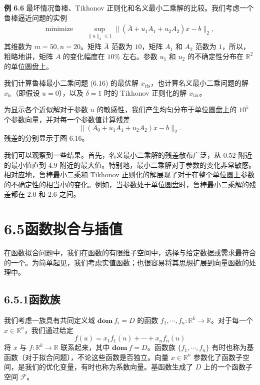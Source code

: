 \documentclass[UTF8, 12pt, fontset=fandol, oneside]{ctexart}
\begin{document}
\noindent\textbf{例 6.6}\quad
最坏情况鲁棒、Tikhonov 正则化和名义最小二乘解的比较。我们考虑一个鲁棒逼近问题的实例
\begin{equation}
\begin{aligned}
\text{minimize}\quad & \sup_{\|u\|_2\leq 1}\|(\bar{A}+u_1A_1+u_2A_2)x-b\|_2,
\end{aligned}
\tag{6.16}
\end{equation}
其维数为 $m=50,n=20$。矩阵 $\bar{A}$ 范数为 $10$，矩阵 $A_1$ 和 $A_2$ 范数为 $1$，所以，粗略地讲，矩阵 $A$ 的变化幅度在 $10\%$ 左右。参数 $u_1$ 和 $u_2$ 的不确定性分布在 $\mathbb{R}^2$ 的单位圆盘上。

我们计算鲁棒最小二乘问题 (6.16) 的最优解 $x_{\mathrm{rls}}$，也计算名义最小二乘问题的解 $x_{\mathrm{ls}}$（即假设 $u=0$），以及 $\delta=1$ 时的 Tikhonov 正则化的解 $x_{\mathrm{tik}}$。

为显示各个近似解对于参数 $u$ 的敏感性，我们产生均匀分布于单位圆盘上的 $10^5$ 个参数向量，并对每一个参数值计算残差
\[
\|(A_0+u_1A_1+u_2A_2)x-b\|_2.
\]
残差的分别显示于图 6.16。

我们可以观察到一些结果。首先，名义最小二乘解的残差散布广泛，从 $0.52$ 附近的最小值直到 $4.9$ 附近的最大值。特别地，最小二乘解对于参数的变化非常敏感。相对应地，鲁棒最小二乘和 Tikhonov 正则化的解展现了对于在整个单位圆上参数的不确定性的相当小的变化。例如，当参数处于单位圆盘时，鲁棒最小二乘解的残差都在 $2.0$ 和 $2.6$ 之间。

\section*{6.5\quad 函数拟合与插值}

在函数拟合问题中，我们在函数的有限维子空间中，选择与给定数据或需求最符合的一个。为简单起见，我们考虑实值函数；也很容易将其思想扩展到向量函数的处理中。

\subsection*{6.5.1\quad 函数族}

我们考虑一族具有共同定义域 $\mathbf{dom}\ f_i=D$ 的函数 $f_1,\cdots,f_n:\mathbb{R}^k\to\mathbb{R}$。对于每一个 $x\in\mathbb{R}^n$，我们通过给定
\begin{equation}
f(u)=x_1f_1(u)+\cdots+x_nf_n(u)
\tag{6.17}
\end{equation}
将 $x$ 与 $f:\mathbb{R}^k\to\mathbb{R}$ 联系起来，其中 $\mathbf{dom}\ f=D$。函数族 $\{f_1,\cdots,f_n\}$ 有时也称为基函数（对于拟合问题），不论这些函数是否独立。向量 $x\in\mathbb{R}^n$ 参数化了函数子空间，是我们的优化变量，有时也称为系数向量。基函数生成了 $D$ 上的一个函数子空间 $\mathcal{F}$。
\end{document}
